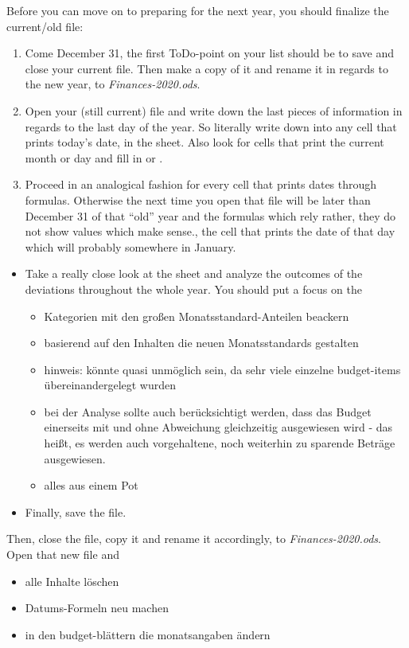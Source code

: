 Before you can move on to preparing \tfn for the next year, you should finalize the current/old file:
\begin{enumerate}
	\item Come December 31, the first ToDo-point on your list should be to save and close your current file.
	Then make a copy of it and rename it in regards to the new year, \eg to \emph{Finances-2020.ods}.
	\item Open your (still current) file and write down the last pieces of information in regards to the last day of the year.
	So literally write down  into any cell that prints today's date, \eg in the  sheet.
	Also look for cells that print the current month or day and fill in  or .
	\item Proceed in an analogical fashion for every cell that prints dates through formulas.
	Otherwise the next time you open that file will be later than December 31 of that ``old'' year and the formulas which rely rather, they do not show values which make sense., the cell that prints the date of that day which will probably somewhere in January.
\end{enumerate}

\begin{itemize}
	\item Take a really close look at the  sheet and analyze the outcomes of the deviations throughout the whole year.
	You should put a focus on the 
	\begin{itemize}
		\item Kategorien mit den großen Monatsstandard-Anteilen beackern
		\item basierend auf den Inhalten die neuen Monatsstandards gestalten
		\item hinweis: könnte quasi unmöglich sein, da sehr viele einzelne budget-items übereinandergelegt wurden
		\item bei der Analyse sollte auch berücksichtigt werden, dass das Budget einerseits mit und ohne Abweichung gleichzeitig ausgewiesen wird - das heißt, es werden auch vorgehaltene, noch weiterhin zu sparende Beträge ausgewiesen.
		\item alles aus einem Pot
	\end{itemize}	
	\item Finally, save the file.	
\end{itemize}

Then, close the file, copy it and rename it accordingly, \eg to \emph{Finances-2020.ods}.
Open that new file and
\begin{itemize}
	\item alle Inhalte löschen
	\item Datums-Formeln neu machen
	\item in den budget-blättern die monatsangaben ändern
\end{itemize}

